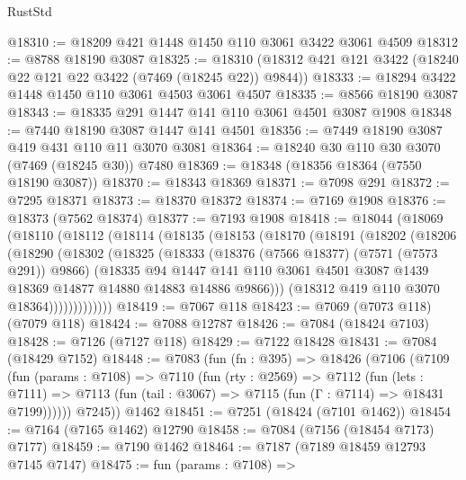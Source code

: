 \begin{lexlean}{RustStd}
\begin{coremodule}
@18310 := @18209 @421 @1448 @1450 @110 @3061 @3422 @3061 @4509
@18312 := @8788 @18190 @3087
@18325 := @18310 (@18312 @421 @121 @3422 (@18240 @22 @121 @22 @3422 (@7469 (@18245 @22)) @9844))
@18333 := @18294 @3422 @1448 @1450 @110 @3061 @4503 @3061 @4507
@18335 := @8566 @18190 @3087
@18343 := @18335 @291 @1447 @141 @110 @3061 @4501 @3087 @1908
@18348 := @7440 @18190 @3087 @1447 @141 @4501
@18356 := @7449 @18190 @3087 @419 @431 @110 @11 @3070 @3081
@18364 := @18240 @30 @110 @30 @3070 (@7469 (@18245 @30)) @7480
@18369 := @18348 (@18356 @18364 (@7550 @18190 @3087))
@18370 := @18343 @18369
@18371 := @7098 @291
@18372 := @7295 @18371
@18373 := @18370 @18372
@18374 := @7169 @1908
@18376 := @18373 (@7562 @18374)
@18377 := @7193 @1908
@18418 := @18044
    (@18069
      (@18110
        (@18112
          (@18114
            (@18135
              (@18153
                (@18170
                  (@18191
                    (@18202
                      (@18206
                        (@18290
                          (@18302
                            (@18325
                              (@18333
                                (@18376 (@7566 @18377) (@7571 (@7573 @291)) @9866)
                                (@18335
                                  @94
                                  @1447
                                  @141
                                  @110
                                  @3061
                                  @4501
                                  @3087
                                  @1439
                                  @18369
                                  @14877
                                  @14880
                                  @14883
                                  @14886
                                  @9866)))
                            (@18312 @419 @110 @3070 @18364)))))))))))))
@18419 := @7067 @118
@18423 := @7069 (@7073 @118) (@7079 @118)
@18424 := @7088 @12787
@18426 := @7084 (@18424 @7103)
@18428 := @7126 (@7127 @118)
@18429 := @7122 @18428
@18431 := @7084 (@18429 @7152)
@18448 := @7083
    (fun (fn : @395) =>
    @18426
      (@7106
        (@7109
          (fun (params : @7108) =>
          @7110
            (fun (rty : @2569) =>
            @7112
              (fun (lets : @7111) =>
              @7113 (fun (tail : @3067) => @7115 (fun (Γ : @7114) => @18431 @7199))))))
        @7245))
    @1462
@18451 := @7251 (@18424 (@7101 @1462))
@18454 := @7164 (@7165 @1462) @12790
@18458 := @7084 (@7156 (@18454 @7173) @7177)
@18459 := @7190 @1462
@18464 := @7187 (@7189 @18459 @12793 @7145 @7147)
@18475 := fun (params : @7108) =>

\end{coremodule}
\end{lexlean}
